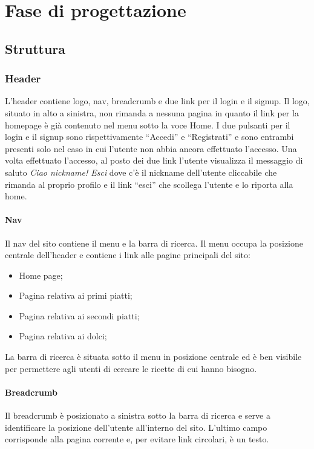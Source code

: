 \section{Fase di progettazione}
\label{sec:fase_di_progettazione}
\subsection{Struttura}
\label{sub:struttura}
\subsubsection{Header}
\label{ssub:header}
L'header contiene logo, nav, breadcrumb e due link per il login e il signup. Il logo, situato in alto a sinistra, non rimanda a nessuna pagina in quanto il link per la homepage è già contenuto nel menu sotto la voce Home. I due pulsanti per il login e il signup sono rispettivamente ``Accedi'' e ``Registrati'' e sono entrambi presenti solo nel caso in cui l'utente non abbia ancora effettuato l'accesso. Una volta effettuato l'accesso, al posto dei due link l'utente visualizza il messaggio di saluto \textit{Ciao nickname! Esci} dove c'è il nickname dell'utente cliccabile che rimanda al proprio profilo e il link ``esci'' che scollega l'utente e lo riporta alla home.
\paragraph{Nav}
\label{par:nav}
Il nav del sito contiene il menu e la barra di ricerca.
Il menu occupa la posizione centrale dell'header e contiene i link alle pagine principali del sito:
\begin{itemize}
	\item Home page;
	\item Pagina relativa ai primi piatti;
	\item Pagina relativa ai secondi piatti;
	\item Pagina relativa ai dolci;
\end{itemize}
La barra di ricerca è situata sotto il menu in posizione centrale ed è ben visibile per permettere agli utenti di cercare le ricette di cui hanno bisogno.
\paragraph{Breadcrumb}
\label{par:breadcrumb}
Il breadcrumb è posizionato a sinistra sotto la barra di ricerca e serve a identificare la posizione dell'utente all'interno del sito. L'ultimo campo corrisponde alla pagina corrente e, per evitare link circolari, è un testo.
